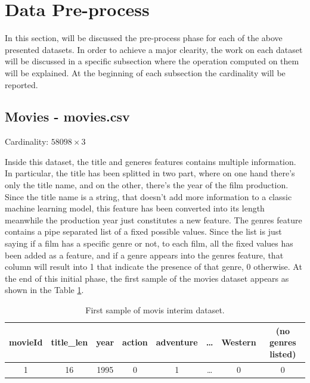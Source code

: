\documentclass[../main]{subfiles}
\begin{document}
\section{Data Pre-process}
In this section, will be discussed the pre-process phase for each of the above presented datasets.
In order to achieve a major clearity, the work on each dataset will be discussed in a specific subsection where the operation computed on them will be explained.
At the beginning of each subsection the cardinality will be reported.

\subsection*{Movies - movies.csv}
Cardinality: $58098 \times 3$

Inside this dataset, the title and generes features contains multiple information.
In particular, the title has been splitted in two part, where on one hand there's only the title name, and on the other, there's the year of the film production.
Since the title name is a string, that doesn't add more information to a classic machine learning model, this feature has been converted into its length meanwhile the production year just constitutes a new feature.
The genres feature contains a pipe separated list of a fixed possible values.
Since the list is just saying if a film has a specific genre or not, to each film, all the fixed values has been added as a feature, and if a genre appears into the genres feature, that column will result into 1 that indicate the presence of that genre, 0 otherwise.
At the end of this initial phase, the first sample of the movies dataset appears as shown in the Table \ref{table:movies-first-sample}.
\begin{table}[h]
    \center
    \begin{tabular}{|c|c|c|c|c|c|c|c|}
    \hline
    \textbf{movieId} & \textbf{title\_len} & \textbf{year} & \textbf{action} & \textbf{adventure} & \textbf{\dots}  & \textbf{Western} & \textbf{(no genres listed)} \\
    \hline
    1                & 16                  & 1995          & 0               & 1                  & \dots           & 0                & 0                           \\
    \hline
    \end{tabular}
    \caption{First sample of movis interim dataset.}
    \label{table:movies-first-sample}
\end{table}
\end{document}
